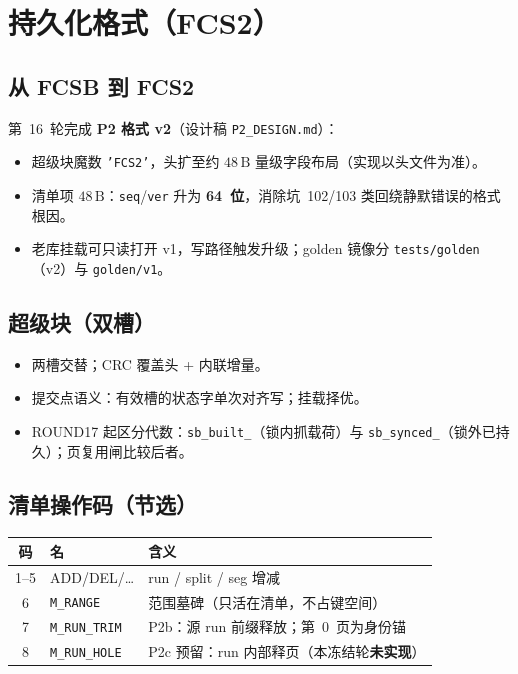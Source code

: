 \section{持久化格式（FCS2）}

\subsection{从 FCSB 到 FCS2}
第~16~轮完成 \textbf{P2 格式 v2}（设计稿 \texttt{P2\_DESIGN.md}）：
\begin{itemize}[leftmargin=1.6em]
  \item 超级块魔数 \texttt{'FCS2'}，头扩至约 $48\,\mathrm{B}$ 量级字段布局（实现以头文件为准）。
  \item 清单项 $48\,\mathrm{B}$：\texttt{seq}/\texttt{ver} 升为 \textbf{64~位}，消除坑~102/103 类回绕静默错误的格式根因。
  \item 老库挂载可只读打开 v1，写路径触发升级；golden 镜像分 \texttt{tests/golden}（v2）与 \texttt{golden/v1}。
\end{itemize}

\subsection{超级块（双槽）}
\begin{itemize}[leftmargin=1.6em]
  \item 两槽交替；CRC 覆盖头 + 内联增量。
  \item 提交点语义：有效槽的状态字单次对齐写；挂载择优。
  \item ROUND17 起区分代数：\texttt{sb\_built\_}（锁内抓载荷）与 \texttt{sb\_synced\_}（锁外已持久）；页复用闸比较后者。
\end{itemize}

\subsection{清单操作码（节选）}
\begin{center}
\begin{tabular}{@{}clp{8.2cm}@{}}
\toprule
码 & 名 & 含义 \\
\midrule
1--5 & ADD/DEL/\ldots & run / split / seg 增减 \\
6 & \texttt{M\_RANGE} & 范围墓碑（只活在清单，不占键空间） \\
7 & \texttt{M\_RUN\_TRIM} & P2b：源 run 前缀释放；第~0~页为身份锚 \\
8 & \texttt{M\_RUN\_HOLE} & P2c 预留：run 内部释页（本冻结轮\textbf{未实现}） \\
\bottomrule
\end{tabular}
\end{center}

